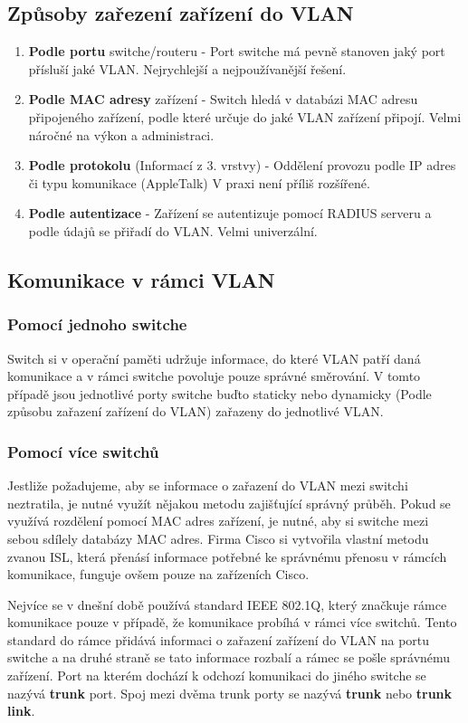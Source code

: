 \subsection{Způsoby zařezení zařízení do VLAN}
\begin{enumerate}
  \item \textbf{Podle portu} switche/routeru - Port switche má pevně stanoven jaký port přísluší jaké VLAN.
        Nejrychlejší a nejpoužívanější řešení.
  \item \textbf{Podle MAC adresy} zařízení - Switch hledá v databázi MAC adresu připojeného zařízení, podle které určuje do jaké VLAN zařízení připojí.
        Velmi náročné na výkon a administraci.
  \item \textbf{Podle protokolu} (Informací z 3. vrstvy) - Oddělení provozu podle IP adres či typu komunikace (AppleTalk)
        V praxi není příliš rozšířené.
  \item \textbf{Podle autentizace} - Zařízení se autentizuje pomocí RADIUS serveru a podle údajů se přiřadí do VLAN.
        Velmi univerzální.
\end{enumerate}
\subsection{Komunikace v rámci VLAN}
\subsubsection{Pomocí jednoho switche}
Switch si v operační paměti udržuje informace, do které VLAN patří daná komunikace a v rámci switche povoluje pouze správné směrování.
V tomto případě jsou jednotlivé porty switche buďto staticky nebo dynamicky (Podle způsobu zařazení zařízení do VLAN) zařazeny do jednotlivé VLAN.
\subsubsection{Pomocí více switchů}
Jestliže požadujeme, aby se informace o zařazení do VLAN mezi switchi neztratila, je nutné využít nějakou metodu zajišťující správný průběh.
Pokud se využívá rozdělení pomocí MAC adres zařízení, je nutné, aby si switche mezi sebou sdílely databázy MAC adres.
Firma Cisco si vytvořila vlastní metodu zvanou ISL, která přenásí informace potřebné ke správnému přenosu v rámcích komunikace, funguje ovšem pouze na zařízeních Cisco.

Nejvíce se v dnešní době používá standard IEEE 802.1Q, který značkuje rámce komunikace pouze v případě, že komunikace probíhá v rámci více switchů.
Tento standard do rámce přidává informaci o zařazení zařízení do VLAN na portu switche a na druhé straně se tato informace rozbalí a rámec se pošle správnému zařízení.
Port na kterém dochází k odchozí komunikaci do jiného switche se nazývá \textbf{trunk} port.
Spoj mezi dvěma trunk porty se nazývá \textbf{trunk} nebo \textbf{trunk link}.
